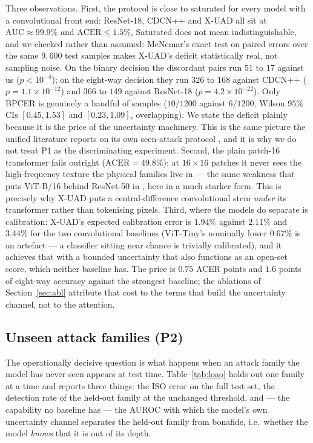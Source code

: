 \documentclass[conference]{IEEEtran}
\begin{document}
Three observations. First, the protocol is close to saturated for every model with
a convolutional front end: ResNet-18, CDCN++ and X-UAD all sit at
$\mathrm{AUC}\approx99.9\%$ and $\mathrm{ACER}\le1.5\%$, Saturated does not mean
indistinguishable, and we checked rather than assumed: McNemar's exact test on
paired errors over the same $9{,}600$ test samples makes X-UAD's deficit
statistically real, not sampling noise. On the binary decision the discordant
pairs run $51$ to $17$ against us ($p<10^{-4}$); on the eight-way decision they run
$326$ to $168$ against CDCN++ ($p=1.1\times10^{-12}$) and $366$ to $149$ against
ResNet-18 ($p=4.2\times10^{-22}$). Only BPCER is genuinely a handful of samples
($10/1200$ against $6/1200$, Wilson $95\%$ CIs $[0.45,1.53]$ and $[0.23,1.09]$,
overlapping). We state the deficit plainly because it is the price of the
uncertainty machinery. This is the same picture the unified
literature reports on its own seen-attack protocol \cite{yu2024unified}, and it is
why we do not treat P1 as the discriminating experiment. Second, the plain
patch-16 transformer fails outright ($\mathrm{ACER}=49.8\%$): at $16\times16$
patches it never sees the high-frequency texture the physical families live in ---
the same weakness that puts ViT-B/16 behind ResNet-50 in \cite{yu2024unified}, here
in a much starker form. This is precisely why X-UAD puts a central-difference
convolutional stem \emph{under} its transformer rather than tokenising pixels.
Third, where the models do separate is calibration: X-UAD's expected calibration
error is $1.94\%$ against $2.11\%$ and $3.44\%$ for the two convolutional
baselines (ViT-Tiny's nominally lower $0.67\%$ is an artefact --- a classifier
sitting near chance is trivially calibrated), and it achieves that with a bounded uncertainty that also functions as
an open-set score, which neither baseline has. The price is $0.75$ ACER points and
$1.6$ points of eight-way accuracy against the strongest baseline; the ablations of
Section~\ref{sec:abl} attribute that cost to the terms that build the uncertainty
channel, not to the attention.

\begin{table}[t]
\centering
\caption{Per-family APCER (\%) at the validation-fixed threshold, protocol P1. The
ISO ACER is driven by the \emph{worst} column.}
\label{tab:pertype}
\small
\resizebox{\linewidth}{!}{}
\end{table}

\subsection{Unseen attack families (P2)}
The operationally decisive question is what happens when an attack family the
model has never seen appears at test time. Table~\ref{tab:loao} holds out one
family at a time and reports three things: the ISO error on the full test set, the
detection rate of the held-out family at the unchanged threshold, and --- the
capability no baseline has --- the AUROC with which the model's own uncertainty
channel separates the held-out family from bonafide, i.e.\ whether the model
\emph{knows} that it is out of its depth.
\end{document}
